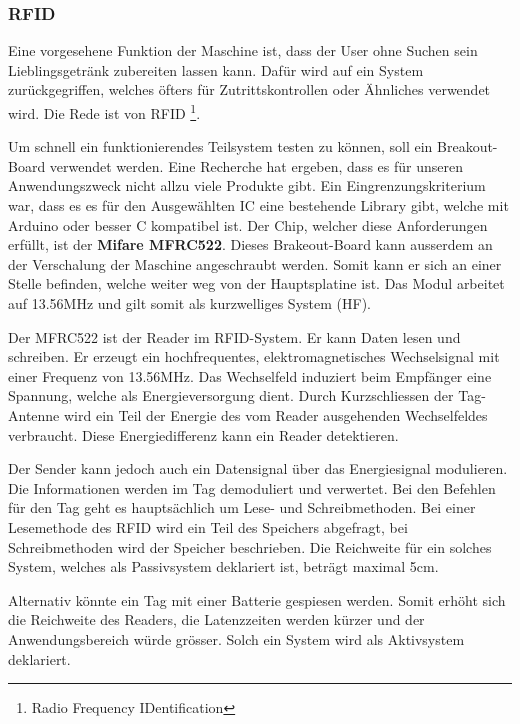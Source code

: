\subsubsection{RFID}
\label{subsubsec:RFID}

Eine vorgesehene Funktion der Maschine ist, dass der User ohne Suchen sein Lieblingsgetränk zubereiten lassen kann. Dafür wird auf ein System zurückgegriffen, welches öfters für Zutrittskontrollen oder Ähnliches verwendet wird. Die Rede ist von RFID \footnote{Radio Frequency IDentification}.

Um schnell ein funktionierendes Teilsystem testen zu können, soll ein Breakout-Board verwendet werden. Eine Recherche hat ergeben, dass es für unseren Anwendungszweck nicht allzu viele Produkte gibt. Ein Eingrenzungskriterium war, dass es es für den Ausgewählten IC eine bestehende Library gibt, welche mit Arduino oder besser C kompatibel ist. Der Chip, welcher diese Anforderungen erfüllt, ist der \textbf{Mifare MFRC522}. Dieses Brakeout-Board kann ausserdem an der Verschalung der Maschine angeschraubt werden. Somit kann er sich an einer Stelle befinden, welche weiter weg von der Hauptsplatine ist.
Das Modul arbeitet auf 13.56MHz und gilt somit als kurzwelliges System (HF). \cite{nxp_semiconductors_nv_mfrc522_2017}

Der MFRC522 ist der Reader im RFID-System. Er kann Daten lesen und schreiben. Er erzeugt ein hochfrequentes, elektromagnetisches Wechselsignal mit einer Frequenz von 13.56MHz. Das Wechselfeld induziert beim Empfänger eine Spannung, welche als Energieversorgung dient. Durch Kurzschliessen der Tag-Antenne wird ein Teil der Energie des vom Reader ausgehenden Wechselfeldes verbraucht. Diese Energiedifferenz kann ein Reader detektieren.

Der Sender kann jedoch auch ein Datensignal über das Energiesignal modulieren. Die Informationen werden im Tag demoduliert und verwertet. Bei den Befehlen für den Tag geht es hauptsächlich um Lese- und Schreibmethoden. Bei einer Lesemethode des RFID wird ein Teil des Speichers abgefragt, bei Schreibmethoden wird der Speicher beschrieben. Die Reichweite für ein solches System, welches als Passivsystem deklariert ist, beträgt maximal 5cm.

Alternativ könnte ein Tag mit einer Batterie gespiesen werden. Somit erhöht sich die Reichweite des Readers, die Latenzzeiten werden kürzer und der Anwendungsbereich würde grösser. Solch ein System wird als Aktivsystem deklariert. \cite{rfid-basisde_aufbau_2018}

